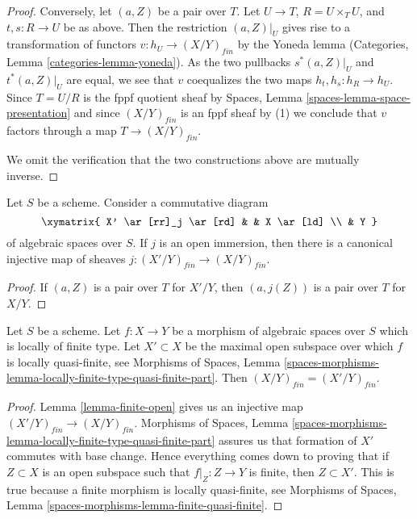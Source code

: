 \begin{proof}
\medskip\noindent
Conversely, let $(a, Z)$ be a pair over $T$.
Let $U \to T$, $R = U \times_T U$, and $t, s : R \to U$ be as
above. Then the restriction $(a, Z)|_U$ gives rise to a
transformation of functors $v : h_U \to (X/Y)_{fin}$ by the
Yoneda lemma
(Categories, Lemma \ref{categories-lemma-yoneda}).
As the two pullbacks $s^*(a, Z)|_U$ and $t^*(a, Z)|_U$
are equal, we see that $v$ coequalizes the two maps
$h_t, h_s : h_R \to h_U$. Since $T = U/R$ is the fppf quotient sheaf by
Spaces, Lemma \ref{spaces-lemma-space-presentation}
and since $(X/Y)_{fin}$ is an fppf sheaf by (1) we conclude
that $v$ factors through a map $T \to (X/Y)_{fin}$.

\medskip\noindent
We omit the verification that the two constructions above are mutually
inverse.
\end{proof}

\begin{lemma}
\label{lemma-finite-open}
Let $S$ be a scheme. Consider a commutative diagram
$$
\xymatrix{
X' \ar[rr]_j \ar[rd] & & X \ar[ld] \\
& Y
}
$$
of algebraic spaces over $S$. If $j$ is an open immersion, then
there is a canonical injective map of sheaves
$j : (X'/Y)_{fin} \to (X/Y)_{fin}$.
\end{lemma}

\begin{proof}
If $(a, Z)$ is a pair over $T$ for $X'/Y$, then
$(a, j(Z))$ is a pair over $T$ for $X/Y$.
\end{proof}

\begin{lemma}
\label{lemma-finite-lives-on-locally-quasi-finite-part}
Let $S$ be a scheme.
Let $f : X \to Y$ be a morphism of algebraic spaces over $S$ which is
locally of finite type.
Let $X' \subset X$ be the maximal open subspace over which $f$ is
locally quasi-finite, see
Morphisms of Spaces,
Lemma \ref{spaces-morphisms-lemma-locally-finite-type-quasi-finite-part}.
Then $(X/Y)_{fin} = (X'/Y)_{fin}$.
\end{lemma}

\begin{proof}
Lemma \ref{lemma-finite-open}
gives us an injective map $(X'/Y)_{fin} \to (X/Y)_{fin}$.
Morphisms of Spaces,
Lemma \ref{spaces-morphisms-lemma-locally-finite-type-quasi-finite-part}
assures us that formation of $X'$ commutes with base change.
Hence everything comes down to proving that if
$Z \subset X$ is an open subspace such that $f|_Z : Z \to Y$ is finite,
then $Z \subset X'$. This is true because a finite morphism
is locally quasi-finite, see
Morphisms of Spaces, Lemma \ref{spaces-morphisms-lemma-finite-quasi-finite}.
\end{proof}

